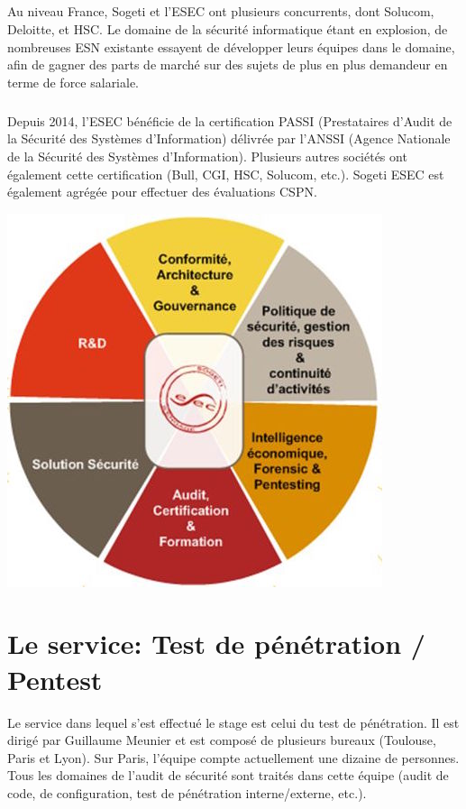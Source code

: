 \subparagraph{}
Au niveau France, Sogeti et l'ESEC ont plusieurs concurrents, dont Solucom, Deloitte,
et HSC. Le domaine de la sécurité informatique étant en explosion, de nombreuses ESN existante
essayent de développer leurs équipes dans le domaine, afin de gagner des parts de marché
sur des sujets de plus en plus demandeur en terme de force salariale.

\subparagraph{}
Depuis 2014, l'ESEC bénéficie de la certification PASSI (Prestataires d'Audit de la Sécurité
des Systèmes d'Information) délivrée par l'ANSSI (Agence Nationale de la Sécurité des Systèmes
d'Information). Plusieurs autres sociétés ont également cette certification (Bull, CGI, HSC, Solucom, etc.).
Sogeti ESEC est également agrégée pour effectuer des évaluations CSPN.

\begin{center}
\includegraphics[scale=0.5]{activities.jpg}
\end{center}

\section*{Le service: Test de pénétration / Pentest}
Le service dans lequel s'est effectué le stage est celui du test de pénétration. Il est dirigé par Guillaume Meunier et est composé
de plusieurs bureaux (Toulouse, Paris et Lyon). Sur Paris, l'équipe compte actuellement une dizaine de personnes. Tous les domaines de l'audit de
sécurité sont traités dans cette équipe (audit de code, de configuration, test de pénétration interne/externe, etc.).

